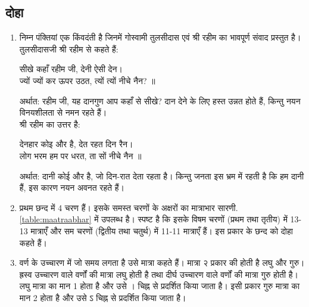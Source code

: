 \subsection{दोहा}
\renewcommand{\theequation}{\theenumi}
\renewcommand{\thefigure}{\theenumi}
\begin{enumerate}[label=\thesubsection.\arabic*.,ref=\thesubsection.\theenumi]
\item   निम्न पंक्तियां एक किंवदंती है जिनमें  गोस्वामी तुलसीदास एवं श्री रहीम का  भावपूर्ण संवाद प्रस्तुत है।   तुलसीदासजी श्री रहीम से कहते हैं:
\label{chand:one}
\begin{flushleft}
सीखे कहाँ रहीम जी, देनी ऐसी देन। 
\\
ज्यों ज्यों कर ऊपर उठत, त्यों त्यों नीचे नैन? ॥
\end{flushleft}
अर्थात: रहीम जी, यह दानगुण आप कहाँ से सीखे? दान देने के लिए हस्त उन्नत होते हैं, किन्तु नयन विनयशीलता  से नमन रहते  हैं। 
\\
श्री रहीम का उत्तर है:
\begin{flushleft}
देनहार कोइ और है,  देत रहत दिन रैन। 
\\
लोग भरम हम पर धरत, ता सों नीचे नैन ॥
\end{flushleft}
अर्थात: दानी कोई और है, जो दिन-रात देता रहता है। किन्तु जनता इस भ्रम में रहती है कि हम दानी हैं, इस कारण नयन अवनत रहते हैं। 
\item प्रथम छन्द  में 4 चरण हैं।   इसके समस्त चरणों  के अक्षरों का मात्राभार सारणी. \ref{table:maatraabhar} में उपलब्ध है। 
स्पष्ट है कि इसके विषम चरणों (प्रथम तथा तृतीय) में 13-13 मात्राएँ और सम चरणों (द्वितीय तथा चतुर्थ) में 11-11 मात्राएँ हैं। इस प्रकार के छन्द को दोहा कहते हैं। 
\begin{table}[!ht]
\centering

\caption{}
\label{table:maatraabhar}
\end{table}
\item  वर्ण के उच्चारण में जो समय लगता है उसे मात्रा कहते हैं। मात्रा २ प्रकार की होती है लघु और गुरु। ह्रस्व उच्चारण वाले वर्णों की मात्रा लघु होती है तथा दीर्घ उच्चारण वाले वर्णों की मात्रा गुरु होती है। लघु मात्रा का मान 1 होता है और उसे । चिह्न से प्रदर्शित किया जाता है। इसी प्रकार गुरु मात्रा का मान 2 होता है और उसे ऽ चिह्न से प्रदर्शित किया जाता है।


\end{enumerate}
